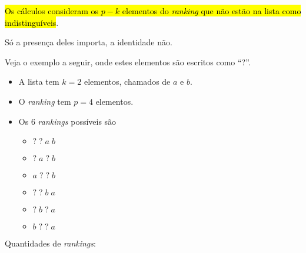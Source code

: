 \documentclass[
  letterpaper,
  DIV=11,
  numbers=noendperiod]{scrreprt}
\providecommand{\tightlist}{%
  \setlength{\itemsep}{0pt}\setlength{\parskip}{0pt}}\usepackage{longtable,booktabs,array}
\begin{document}
\begin{tcolorbox}[enhanced jigsaw, toptitle=1mm, colback=white, colframe=quarto-callout-note-color-frame, colbacktitle=quarto-callout-note-color!10!white, titlerule=0mm, rightrule=.15mm, toprule=.15mm, breakable, leftrule=.75mm, left=2mm, coltitle=black, opacitybacktitle=0.6, bottomtitle=1mm, title=\textcolor{quarto-callout-note-color}{\faInfo}\hspace{0.5em}{Atenção}, arc=.35mm, opacityback=0, bottomrule=.15mm]

{\hl{Os cálculos consideram os $p - k$ elementos do \emph{ranking} que
não estão na lista como indistinguíveis}}.

Só a presença deles importa, a identidade não.

Veja o exemplo a seguir, onde estes elementos são escritos como ``?''.

\begin{itemize}
\item
  A lista tem $k = 2$ elementos, chamados de $a$ e $b$.
\item
  O \emph{ranking} tem $p = 4$ elementos.
\item
  Os $6$ \emph{rankings} possíveis são

  \begin{itemize}
  \tightlist
  \item
    $?\;?\;a\;b$
  \item
    $?\;a\;?\;b$
  \item
    $a\;?\;?\;b$
  \item
    $?\;?\;b\;a$
  \item
    $?\;b\;?\;a$
  \item
    $b\;?\;?\;a$
  \end{itemize}
\end{itemize}

\end{tcolorbox}

Quantidades de \emph{rankings}:
\end{document}
